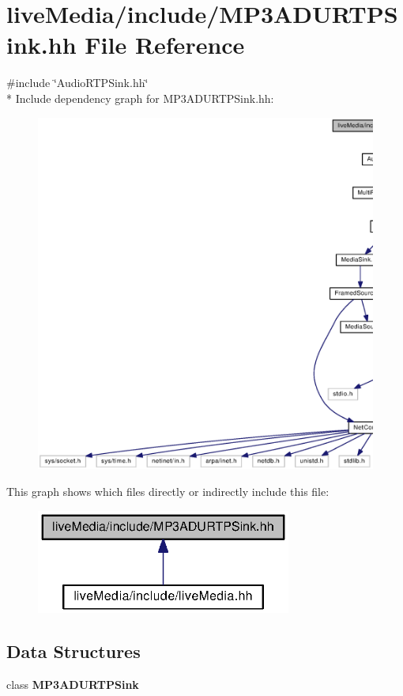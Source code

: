 \section{live\+Media/include/\+M\+P3\+A\+D\+U\+R\+T\+P\+Sink.hh File Reference}
\label{MP3ADURTPSink_8hh}
{\ttfamily \#include \char`\"{}Audio\+R\+T\+P\+Sink.\+hh\char`\"{}}\\*
Include dependency graph for M\+P3\+A\+D\+U\+R\+T\+P\+Sink.\+hh\+:
\nopagebreak
\begin{figure}[H]
\begin{center}
\leavevmode
\includegraphics[width=350pt]{MP3ADURTPSink_8hh__incl}
\end{center}
\end{figure}
This graph shows which files directly or indirectly include this file\+:
\nopagebreak
\begin{figure}[H]
\begin{center}
\leavevmode
\includegraphics[width=238pt]{MP3ADURTPSink_8hh__dep__incl}
\end{center}
\end{figure}
\subsection*{Data Structures}
\begin{DoxyCompactItemize}
\item 
class {\bf M\+P3\+A\+D\+U\+R\+T\+P\+Sink}
\end{DoxyCompactItemize}
